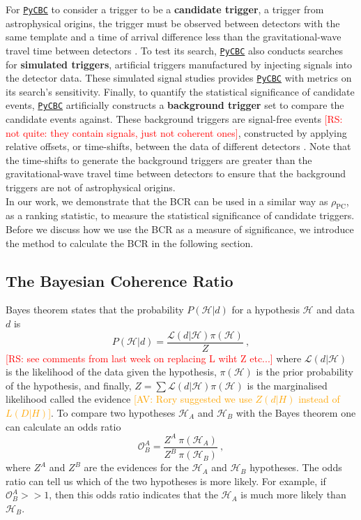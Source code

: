 \documentclass[%
preprint,
 amsmath,amssymb,
 aps,
]{revtex4}
\newcommand{\pycbc}{{\sc \href{https://pycbc.org/}{\texttt{PyCBC}}}\xspace}
\newcommand{\bcr}{{\sc BCR}\xspace}
\newcommand{\av}[1]{\textcolor{orange}{[AV: #1]}}
\newcommand{\rs}[1]{\textcolor{red}{[RS: #1]}}
\begin{document}
For \pycbc to consider a trigger to be a \textbf{candidate trigger}, a trigger from astrophysical origins, the trigger must be observed between detectors with the same template and a time of arrival difference less than the gravitational-wave travel time between detectors \cite{pycbc_og6}. To test its search, \pycbc also conducts searches for \textbf{simulated triggers}, artificial triggers manufactured by injecting signals into the detector data. These simulated signal studies provides \pycbc with metrics on its search's sensitivity. Finally, to quantify the statistical significance of candidate events, \pycbc artificially constructs a \textbf{background trigger} set to compare the candidate events against. These background triggers are signal-free events \rs{not quite: they contain signals, just not coherent ones}, constructed by applying relative offsets, or time-shifts, between the data of different detectors \cite{pycbc_og6}. Note that the time-shifts to generate the background triggers are greater than the gravitational-wave travel time between detectors to ensure that the background triggers are not of astrophysical origins. \\

In our work, we demonstrate that the \bcr can be used in a similar way as $\rho_\text{PC}$, as a ranking statistic, to measure the statistical significance of candidate triggers. Before we discuss how we use the \bcr as a measure of significance, we introduce the method to calculate the \bcr in the following section.\\


\subsection{The Bayesian Coherence Ratio}

Bayes theorem states that the probability $P(\mathcal{H}|d)$ for a hypothesis $\mathcal{H}$ and data $d$ is
\begin{equation}
    P(\mathcal{H}|d) = \frac{\mathcal{L}(d|\mathcal{H})\pi(\mathcal{H})}{Z}\ , 
\end{equation}
\rs{see comments from last week on replacing L wiht Z etc...}
where $\mathcal{L}(d|\mathcal{H})$ is the likelihood of the data given
the hypothesis,  $\pi(\mathcal{H})$ is the prior probability of the hypothesis, and finally, $Z = \sum \mathcal{L}(d|\mathcal{H})  \pi(\mathcal{H})$ is the marginalised likelihood called the evidence \av{Rory suggested we use $Z(d|H)$ instead of $L(D|H)$}.  To compare two hypotheses $\mathcal{H}_A$ and $\mathcal{H}_B$ with the Bayes theorem one can calculate an odds ratio
\begin{equation}
    \mathcal{O}^A_B = \frac{Z^A\ \pi(\mathcal{H}_A)}{Z^B\ \pi(\mathcal{H}_B)}\ ,
\end{equation}
where $Z^A$ and $Z^B$ are the evidences for the $\mathcal{H}_A$ and $\mathcal{H}_B$ hypotheses. The odds ratio can tell us which of the two hypotheses is more likely. For example, if $\mathcal{O}^A_B >> 1$, then this odds ratio indicates that the $\mathcal{H}_A$ is much more likely than $\mathcal{H}_B$. \\
\end{document}
